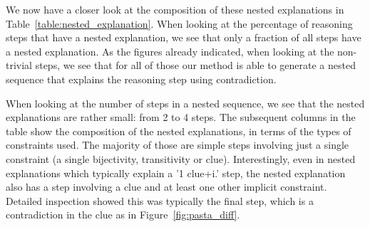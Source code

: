 We now have a closer look at the composition of these nested explanations in Table~\ref{table:nested_explanation}.
When looking at the percentage of reasoning steps that have a nested explanation, we see that only a fraction of all steps have a nested explanation. 
As the figures already indicated, when looking at the non-trivial steps, we see that for all of those our method is able to generate a nested sequence that explains the reasoning step using contradiction. 



When looking at the number of steps in a nested sequence, we see that the nested explanations are rather small: from 2 to 4 steps.
The subsequent columns in the table show the composition of the nested explanations, in terms of the types of constraints used. 
The majority of those are simple steps involving just a single constraint (a single bijectivity, transitivity or clue). 
Interestingly, even in nested explanations which typically explain a '1 clue+i.' step, the nested explanation also has a step involving a clue and at least one other implicit constraint. 
Detailed inspection showed this was typically the final step, which is a contradiction in the clue as in Figure~\ref{fig:pasta_diff}. 


